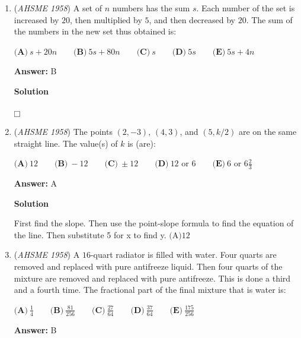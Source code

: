 \begin{enumerate}
 \textbf{Answer: }E



\textbf{Solution}

125. Rearrange the equation into 
 \[\log_{5}{k}\cdot\log_{k}{x} = 3\] which is just 
 \[\log_{5}{x} = 3\] and x is 125.

 


	\item (\textit{AHSME 1958}) A set of $n$ numbers has the sum $s$. Each number of the set is increased by $20$, then multiplied by $5$, and then decreased by $20$. The sum of the numbers in the new set thus obtained is:


 $\textbf{(A)}\ s + 20n\qquad  \textbf{(B)}\ 5s + 80n\qquad  \textbf{(C)}\ s\qquad  \textbf{(D)}\ 5s\qquad  \textbf{(E)}\ 5s + 4n$

 \textbf{Answer: }B



\textbf{Solution}

$\fbox{}$



	\item (\textit{AHSME 1958}) The points $(2,-3)$, $(4,3)$, and $(5, k/2)$ are on the same straight line. The value(s) of $k$ is (are):


 $\textbf{(A)}\ 12\qquad  \textbf{(B)}\ -12\qquad  \textbf{(C)}\ \pm 12\qquad  \textbf{(D)}\ {12}\text{ or }{6}\qquad  \textbf{(E)}\ {6}\text{ or }{6\frac{2}{3}}$

 \textbf{Answer: }A



\textbf{Solution}

First find the slope. Then use the point-slope formula to find the equation of the line. Then substitute 5 for x to find y. $\text{(A)}12$



	\item (\textit{AHSME 1958}) A $16$-quart radiator is filled with water. Four quarts are removed and replaced with pure antifreeze liquid. Then four quarts of the mixture are removed and replaced with pure antifreeze. This is done a third and a fourth time. The fractional part of the final mixture that is water is:


 $\textbf{(A)}\ \frac{1}{4}\qquad  \textbf{(B)}\ \frac{81}{256}\qquad  \textbf{(C)}\ \frac{27}{64}\qquad  \textbf{(D)}\ \frac{37}{64}\qquad  \textbf{(E)}\ \frac{175}{256}$

 \textbf{Answer: }B




\end{enumerate}
